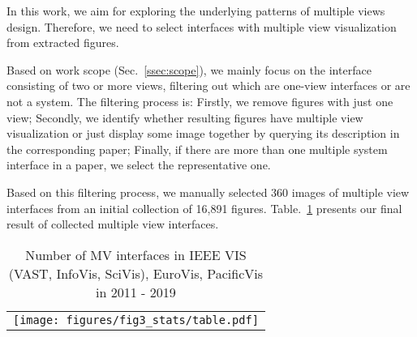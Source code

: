 In this work, we aim for exploring the underlying patterns of multiple views design. 
Therefore, we need to select interfaces with multiple view visualization from extracted figures.

Based on work scope (Sec.~\ref{ssec:scope}), we mainly focus on the interface consisting of two or more views, filtering out which are one-view interfaces or are not a system.
The filtering process is:
  Firstly, we remove figures with just one view;
  Secondly, we identify whether resulting figures have multiple view visualization or just display some image together by querying its description in the corresponding paper;
  Finally, if there are more than one multiple system interface in a paper, we select the representative one.

Based on this filtering process, we manually selected 360 images of multiple view interfaces from an initial collection of 16,891 figures.
Table.~\ref{tab:conf-num} presents our final result of collected multiple view interfaces.


\begin{table}[H]
\caption{Number of MV interfaces in IEEE VIS (VAST, InfoVis, SciVis), EuroVis, PacificVis in 2011 - 2019}
\begin{tabular}{c}
\begin{minipage}{0.1\textwidth}
\texttt{[image: figures/fig3\_stats/table.pdf]}
\end{minipage}
\end{tabular}
\label{tab:conf-num}
\end{table}

